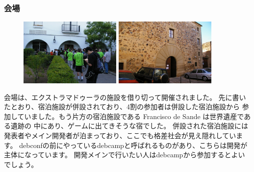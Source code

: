 \documentclass[mingoth,a4paper]{jsarticle}
\begin{document}
\subsubsection{会場}

\begin{figure}
  \includegraphics[width=5cm]{image200908/debconf9_venue.jpg}
  \includegraphics[width=5cm]{image200908/debconf9-fds.jpg}
\end{figure}
  会場は、エクストラマドゥーラの施設を借り切って開催されました。
  先に書いたとおり、宿泊施設が併設されており、4割の参加者は併設した宿泊施設から
  参加していました。もう片方の宿泊施設である Francisco de Sande は世界遺産である遺跡の
  中にあり、ゲームに出てきそうな宿でした。
  併設された宿泊施設には発表者やメイン開発者が泊まっており、ここでも格差社会が見え隠れしています。
  debconfの前にやっているdebcampと呼ばれるものがあり、こちらは開発が主体になっています。
  開発メインで行いたい人はdebcampから参加するとよいでしょう。
  \\
\end{document}
